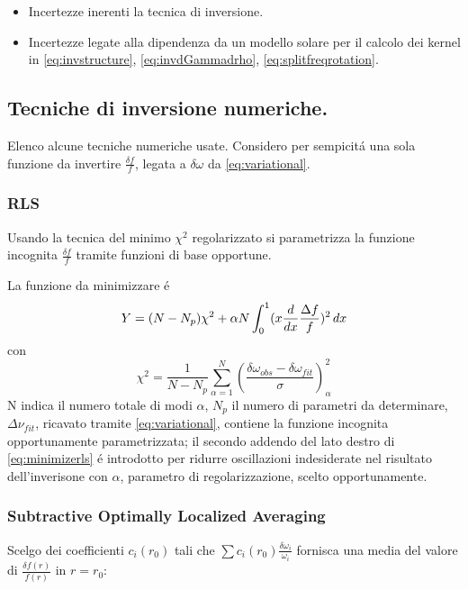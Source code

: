 {\begin{itemize}
\item Incertezze inerenti la tecnica di inversione.

\item Incertezze legate alla dipendenza da un modello solare per il calcolo dei kernel in \eqref{eq:invstructure}, \eqref{eq:invdGammadrho}, \eqref{eq:splitfreqrotation}.

\end{itemize}


\subsection{Tecniche di inversione numeriche.}

Elenco alcune tecniche numeriche usate. Considero per sempicit\'a una sola funzione da invertire $\frac{\delta f}{f}$, legata a $\delta\omega$ da \eqref{eq:variational}.


\subsubsection{RLS}

Usando la tecnica del minimo $\chi^2$ regolarizzato si parametrizza la funzione incognita $\frac{\delta f}{f}$ tramite funzioni di base opportune.

La funzione da minimizzare \'e
\begin{equation}
Y=(N-N_p)\chi^2+\alpha N\int_0^1(x\frac{d}{d x}\frac{\Delta f}{f})^2\,dx\label{eq:minimizerls}
\end{equation}
con
\begin{equation}
\chi^2=\frac{1}{N-N_p}\sum_{\alpha=1}^N(\frac{\delta\omega_{obs}-\delta\omega_{fit}}{\sigma})^2_{\alpha}
\end{equation}
N indica il numero totale di modi $\alpha$, $N_p$ il numero di parametri da determinare, $\Delta\nu_{fit}$, ricavato tramite \eqref{eq:variational}, contiene la funzione incognita opportunamente parametrizzata; il secondo addendo del lato destro di \eqref{eq:minimizerls} \'e introdotto per ridurre oscillazioni indesiderate nel risultato dell'inverisone con $\alpha$, parametro di regolarizzazione, scelto opportunamente.

\subsubsection{Subtractive Optimally Localized Averaging}

Scelgo dei coefficienti $c_i(r_0)$ tali che $\sum c_i(r_0)\frac{\delta\omega_i}{\omega_i}$ fornisca una media del valore di $\frac{\delta f(r)}{f(r)}$ in $r=r_0$:

}
